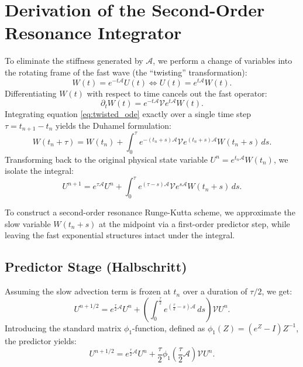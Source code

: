 \documentclass[11pt,a4paper]{article}
\begin{document}
\section{Derivation of the Second-Order Resonance Integrator}
To eliminate the stiffness generated by $\mathcal{A}$, we perform a change of variables into the rotating frame of the fast wave (the ``twisting'' transformation):
\begin{equation}
    W(t) = e^{-t\mathcal{A}}U(t) \iff U(t) = e^{t\mathcal{A}}W(t).
\end{equation}
Differentiating $W(t)$ with respect to time cancels out the fast operator:
\begin{equation}
    \partial_t W(t) = e^{-t\mathcal{A}}\mathcal{V}e^{t\mathcal{A}}W(t). \label{eq:twisted_ode}
\end{equation}
Integrating equation \eqref{eq:twisted_ode} exactly over a single time step $\tau = t_{n+1} - t_n$ yields the Duhamel formulation:
\begin{equation}
    W(t_n + \tau) = W(t_n) + \int_{0}^{\tau} e^{-(t_n + s)\mathcal{A}}\mathcal{V}e^{(t_n + s)\mathcal{A}}W(t_n + s) \, ds.
\end{equation}
Transforming back to the original physical state variable $U^n = e^{t_n\mathcal{A}}W(t_n)$, we isolate the integral:
\begin{equation}
    U^{n+1} = e^{\tau\mathcal{A}}U^n + \int_{0}^{\tau} e^{(\tau - s)\mathcal{A}}\mathcal{V}e^{s\mathcal{A}}W(t_n + s) \, ds. \label{eq:duhamel_phys}
\end{equation}

To construct a second-order resonance Runge-Kutta scheme, we approximate the slow variable $W(t_n + s)$ at the midpoint via a first-order predictor step, while leaving the fast exponential structures intact under the integral.

\subsection{Predictor Stage (Halbschritt)}
Assuming the slow advection term is frozen at $t_n$ over a duration of $\tau/2$, we get:
\begin{equation}
    U^{n+1/2} = e^{\frac{\tau}{2}\mathcal{A}}U^n + \left(\int_{0}^{\frac{\tau}{2}} e^{(\frac{\tau}{2} - s)\mathcal{A}}\,ds\right)\mathcal{V}U^n.
\end{equation}
Introducing the standard matrix $\phi_1$-function, defined as $\phi_1(Z) = (e^Z - I)Z^{-1}$, the predictor yields:
\begin{equation}
    U^{n+1/2} = e^{\frac{\tau}{2}\mathcal{A}}U^n + \frac{\tau}{2}\phi_1\left(\frac{\tau}{2}\mathcal{A}\right)\mathcal{V}U^n. \label{eq:predictor}
\end{equation}
\end{document}
